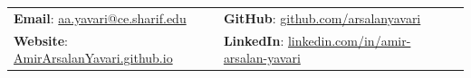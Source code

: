 \documentclass[letterpaper, 11pt]{article}
\begin{document}


\vspace{0.5cm} 
\begin{center}
\begin{tabular}{lll}
\textbf{Email}: \href{mailto:aa.yavari@ce.sharif.edu}{aa.yavari@ce.sharif.edu}     &
\hspace{0.4in} \textbf{GitHub}: \href{https://gitranks.com/profile/arsalanyavari}{github.com/arsalanyavari}  \\

\textbf{Website}: \href{https://arsalanyavari.github.io}{AmirArsalanYavari.github.io}  & 
\hspace{0.4in} \textbf{LinkedIn}: \href{https://www.linkedin.com/in/amir-arsalan-yavari}{linkedin.com/in/amir-arsalan-yavari}

\end{tabular}
\end{center}


\setlength{\tabcolsep}{8pt}
\end{document}
